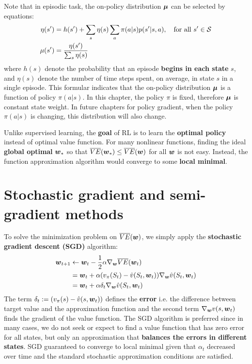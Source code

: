 \documentclass[11pt]{article}
\begin{document}
Note that in episodic task, the on-policy distribution $\boldsymbol{\mu}$ can be selected by equations:
\begin{align*}
\eta(s') &= h(s') + \sum_{s}\eta(s) \sum_{a}\pi(a|s)p(s'|s, a), \quad \text{for all } s'\in {\mathcal S} \\
\mu(s') &= \frac{\eta(s')}{\sum_{s}\eta(s)}
\end{align*} where $h(s)$ denote the probability that an episode \textbf{begins in each state} $s$, and $\eta(s)$ denote the number of time steps spent, on average, in state $s$ in a single episode. This formular indicates that the on-policy distribution $\boldsymbol{\mu}$ is a function of policy $\pi(a|s)$. In this chapter, the policy $\pi$ is fixed, therefore $\boldsymbol{\mu}$ is constant state weight. In future chapters for policy gradient, when the policy  $\pi(a|s)$ is changing, this distribution will also change. 

Unlike supervised learning, the \textbf{goal} of RL is to learn the \textbf{optimal policy} instead of optimal value function. For many nonlinear functions, finding the ideal \textbf{global optimal} $\boldsymbol{w}_*$ so that $\overline{VE}(\boldsymbol{w}_*) \le \overline{VE}(\boldsymbol{w})$ for all $\boldsymbol{w}$ is not easy. Instead, the function approximation algorithm would converge to some \textbf{local minimal}.

\section{Stochastic gradient and semi-gradient methods}
To solve the minimization problem on $\overline{VE}(\boldsymbol{w})$, we simply apply the \textbf{stochastic gradient descent (SGD)} algorithm:
\begin{align*}
\boldsymbol{w}_{t+1} &\leftarrow \boldsymbol{w}_{t} - \frac{1}{2}\alpha \nabla_{\boldsymbol{w}}{\overline{VE}( \boldsymbol{w}_{t})} \\
&=  \boldsymbol{w}_{t} + \alpha (v_{\pi}(S_{t}) - \hat{v}(S_{t}, \boldsymbol{w}_{t})) \nabla_{\boldsymbol{w}}{\hat{v}(S_{t}, \boldsymbol{w}_{t})} \\
&= \boldsymbol{w}_{t} + \alpha\delta_{t} \nabla_{\boldsymbol{w}}{\hat{v}(S_{t}, \boldsymbol{w}_{t})} 
\end{align*} The term $\delta_{t}:= (v_{\pi}(s) - \hat{v}(s, \boldsymbol{w}_{t})) $ defines the \textbf{error} i.e. the difference between target value and the approximation function and the second term $\nabla_{\boldsymbol{w}}{v(s, \boldsymbol{w}_{t})}$ finds the gradient of the value function. The SGD algorithm is preferred since in many cases, we do not seek or expect to find a value function that has zero error for all states, but only an approximation that \textbf{balances the errors in different states}. SGD guaranteed to converge to local minimal given that $\alpha_t$ decreased over time and  the standard stochastic approximation conditions are satisfied. 
\end{document}
